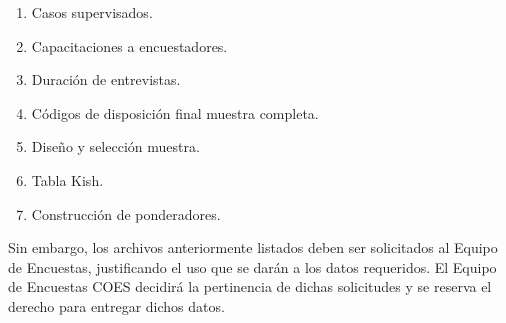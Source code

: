 \documentclass[
  openany]{book}
\providecommand{\tightlist}{%
  \setlength{\itemsep}{0pt}\setlength{\parskip}{0pt}}
\begin{document}
\begin{enumerate}
\def\labelenumi{\arabic{enumi}.}
\tightlist
\item
  Casos supervisados.
\item
  Capacitaciones a encuestadores.
\item
  Duración de entrevistas.
\item
  Códigos de disposición final muestra completa.
\item
  Diseño y selección muestra.
\item
  Tabla Kish.
\item
  Construcción de ponderadores.
\end{enumerate}

Sin embargo, los archivos anteriormente listados deben ser solicitados al Equipo de Encuestas, justificando el uso que se darán a los datos requeridos. El Equipo de Encuestas COES decidirá la pertinencia de dichas solicitudes y se reserva el derecho para entregar dichos datos.


\end{document}
